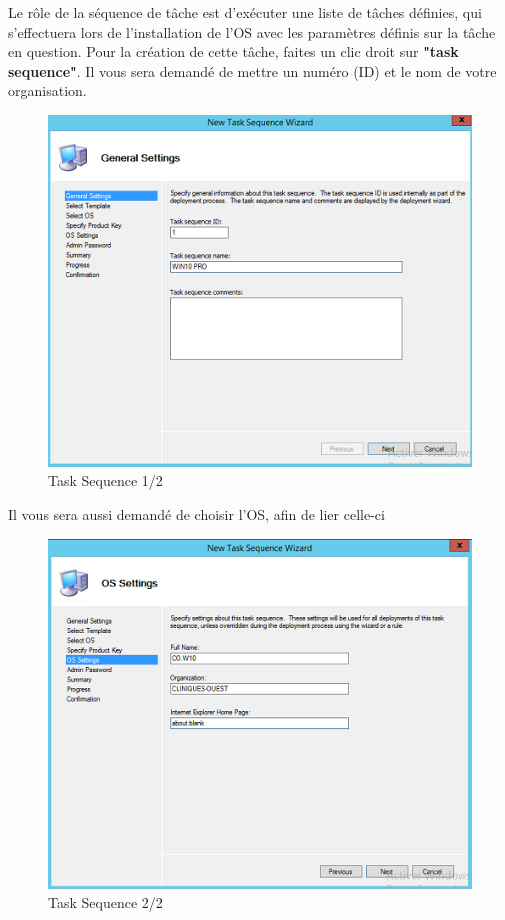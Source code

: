 \documentclass[11pt,a4paper,oneside]{article}
\begin{document}
\newpage
Le rôle de la séquence de tâche est d’exécuter une liste de tâches définies, qui s'effectuera lors de l'installation de l'OS avec les paramètres définis sur la tâche en question. Pour la création de cette tâche, faites un clic droit sur \textbf{"task sequence"}. Il vous sera demandé de mettre un numéro (ID) et le nom de votre organisation.
\begin{figure}[hbtp]
\centering
\includegraphics[scale=0.7]{Pictures/MDT/MDT7.png}
\caption{\label{etiquette} Task Sequence 1/2}
\end{figure}

Il vous sera aussi demandé de choisir l'OS, afin de lier celle-ci
\begin{figure}[hbtp]
\centering
\includegraphics[scale=0.7]{Pictures/MDT/MDT8.png}
\caption{\label{etiquette} Task Sequence 2/2}
\end{figure}
\end{document}

